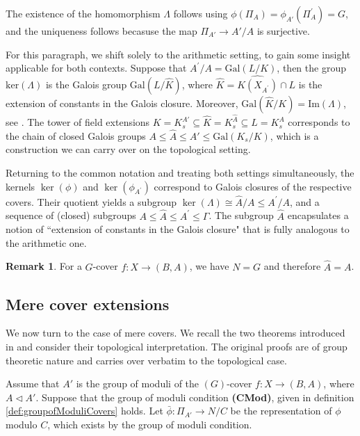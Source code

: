 \documentclass[10pt]{amsart}
\theoremstyle{definition}
\newtheorem{remark}[theorem]{Remark}
\newcommand{\Gal}{{ \mathrm{Gal}}}
\begin{document}
The existence of the homomorphism $\Lambda$ follows using $\phi(\Pi_A)= \phi_{A'}(\Pi_{A}^\prime) = G$, and the uniqueness follows becasuse the map $\Pi_{A'} \rightarrow  {A'}/A$ is surjective.


For this paragraph, we shift solely to the arithmetic setting, to gain some insight applicable for both contexts. Suppose that $A^\prime/A = \Gal(L/K)$, then the group $\mathrm{ker}(\Lambda)$ is the Galois group $\Gal(L/\hat{K})$, where $\hat{K}=\widehat{K(X_{A^\prime})} \cap L$ is the extension of constants in the Galois closure. Moreover, $\Gal(\hat{K}/K)=\mathrm{Im}(\Lambda)$, see \cite[sec. 2.8]{DebesDouai97}. 
The tower of field extensions $K = K_s^{A'} \subseteq  \hat{K} = K_s^{\hat{A}} \subseteq L=K_s^A$ corresponds to the chain of closed Galois groups $ A \leq   \hat{A} \leq A' \leq \Gal(K_s/K)$, which is a construction we can carry over on the topological setting.


Returning to the common notation and treating both settings simultaneously, the kernels $\ker(\phi)$ and $\ker(\phi_{A^\prime})$ correspond to Galois closures of the respective covers. Their quotient yields a subgroup $\ker (\Lambda) \cong \hat{A}/A \leq A^\prime/A$, and a sequence of (closed) subgroups $A\leq \hat{A} \leq A^\prime \leq \mathfrak{\Gamma}$. The subgroup $\hat{A}$ encapsulates a notion of “extension of constants in the Galois closure" that is fully analogous to the arithmetic one.





\begin{remark}{\label{rem:GcoversL}}
For a $G$-cover $f\colon X\rightarrow (B,A)$, we have $N=G$ and therefore $\hat{A}=A$.
\end{remark}


\subsection{Mere cover extensions}
\label{sec:mercovers}
 
We now turn to the case of mere covers. We recall the two theorems introduced in \cite{DebesDouai97} and consider their topological interpretation. The original proofs are of group theoretic nature and carries over verbatim to the topological case.  

Assume that $A'$ is the group of moduli of the $(G)$-cover $f\colon X \rightarrow (B,A)$, where $A \lhd A'$. Suppose that the group of moduli condition \textbf{(CMod)}, given in definition \ref{def:groupofModuliCovers} holds. 
Let $\bar{\phi}\colon \Pi_{A'}  \rightarrow N/C$ be the representation of $\phi$ modulo $C$, which exists by the group of moduli condition. 
\end{document}

